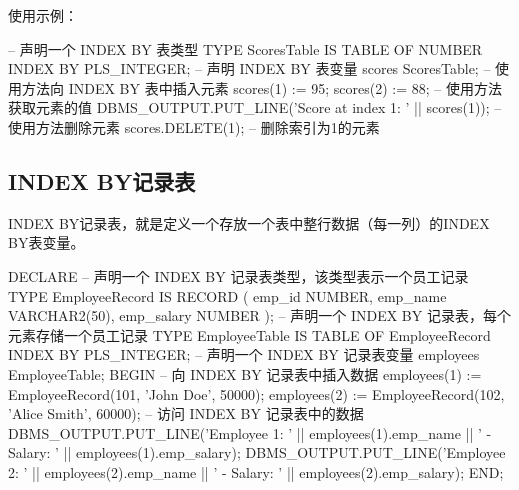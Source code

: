 \documentclass[11pt, a4paper, oneside, UTF8]{ctexbook}
\begin{document}
使用示例：
\begin{plsql}[caption=表方法示例代码]
-- 声明一个 INDEX BY 表类型
TYPE ScoresTable IS TABLE OF NUMBER INDEX BY PLS_INTEGER;
-- 声明 INDEX BY 表变量
scores ScoresTable;
-- 使用方法向 INDEX BY 表中插入元素
scores(1) := 95;
scores(2) := 88;
-- 使用方法获取元素的值
DBMS_OUTPUT.PUT_LINE('Score at index 1: ' || scores(1));
-- 使用方法删除元素
scores.DELETE(1); -- 删除索引为1的元素
\end{plsql}

\subsection{INDEX BY记录表}
INDEX BY记录表，就是定义一个存放一个表中整行数据（每一列）的INDEX BY表变量。

\begin{plsql}[caption=INDEX BY记录表使用示例]
DECLARE
  -- 声明一个 INDEX BY 记录表类型，该类型表示一个员工记录
  TYPE EmployeeRecord IS RECORD (
    emp_id NUMBER,
    emp_name VARCHAR2(50),
    emp_salary NUMBER
  );
  -- 声明一个 INDEX BY 记录表，每个元素存储一个员工记录
  TYPE EmployeeTable IS TABLE OF EmployeeRecord INDEX BY PLS_INTEGER;
  -- 声明一个 INDEX BY 记录表变量
  employees EmployeeTable;
BEGIN
  -- 向 INDEX BY 记录表中插入数据
  employees(1) := EmployeeRecord(101, 'John Doe', 50000);
  employees(2) := EmployeeRecord(102, 'Alice Smith', 60000);
  -- 访问 INDEX BY 记录表中的数据
  DBMS_OUTPUT.PUT_LINE('Employee 1: ' || employees(1).emp_name || ' - Salary: ' || employees(1).emp_salary);
  DBMS_OUTPUT.PUT_LINE('Employee 2: ' || employees(2).emp_name || ' - Salary: ' || employees(2).emp_salary);
END;
\end{plsql}
\end{document}
